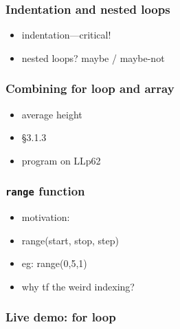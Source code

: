\documentclass[english,14pt]{beamer}
\begin{document}

\begin{frame}[fragile]

\frametitle{Indentation and nested loops}

\begin{itemize}
	\item indentation---critical!
	\item nested loops? maybe / maybe-not
\end{itemize}

\end{frame}


\begin{frame}[fragile]

\frametitle{Combining for loop and array}

\begin{itemize}
	\item average height
	\item \S3.1.3
	\item program on LLp62
\end{itemize}

\end{frame}


\begin{frame}[fragile]

\frametitle{\texttt{range} function}

\begin{itemize}
	\item motivation: 
	\item range(start, stop, step)
	\item eg: range(0,5,1)
	\item why tf the weird indexing?
\end{itemize}

\end{frame}


\begin{frame}[fragile]

\frametitle{Live demo: for loop}

\end{frame}

\end{document}

